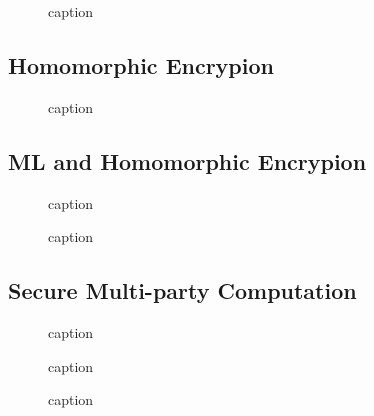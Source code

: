\documentclass[11pt]{article}
\begin{document}
\begin{figure}[H]
    \centering
    \caption{caption}
\end{figure}

\subsection{Homomorphic Encrypion}

\begin{figure}[H]
    \centering
    \caption{caption}
\end{figure}

\subsection{ML and Homomorphic Encrypion}

\begin{figure}[H]
    \centering
    \caption{caption}
\end{figure}

\begin{figure}[H]
    \centering
    \caption{caption}
\end{figure}

\subsection{Secure Multi-party Computation} 

\begin{figure}[H]
    \centering
    \caption{caption}
\end{figure}

\begin{figure}[H]
    \centering
    \caption{caption}
\end{figure}

\begin{figure}[H]
    \centering
    \caption{caption}
\end{figure}
\end{document}
